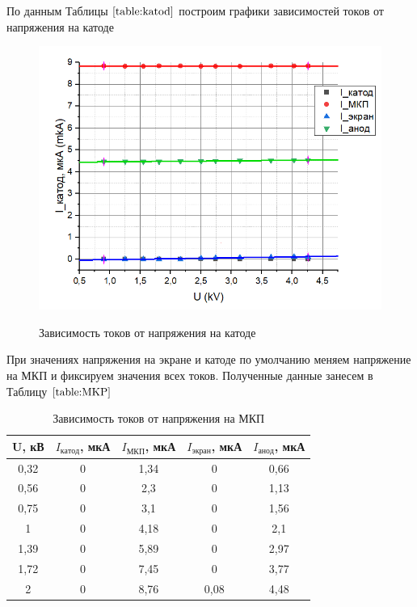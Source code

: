 \documentclass[a4paper,12pt]{article}
\begin{document}
По данным Таблицы $\ref{table:katod}$ построим графики зависимостей токов от напряжения на катоде


\begin{figure}[h!]
	\begin{center}
	\includegraphics[scale=0.8]{1}
	\label{graph:katod}
	\caption{Зависимость токов от напряжения на катоде}
	\end{center}
\end{figure}

\newpage

При значениях напряжения на экране и катоде по умолчанию меняем напряжение на МКП и фиксируем значения всех токов. Полученные данные занесем в Таблицу $\ref{table:MKP}$

\begin{table}[h]
\begin{center}
\caption{Зависимость токов от напряжения на МКП}
\label{table:MKP}
\begin{tabular}{|c|c|c|c|c|}
\hline
{\textbf{U}, кВ} & \multicolumn{1}{c|}{\textbf{$I_{катод}$}, мкА} & \multicolumn{1}{c|}{\textbf{$I_{МКП}$}, мкА} & \multicolumn{1}{c|}{\textbf{$I_{экран}$}, мкА} & {\textbf{$I_{анод}$}, мкА}  \\ \hline
0,32       & 0                 & 1,34            & 0                 & 0,66             \\ \hline
0,56       & 0                 & 2,3             & 0                 & 1,13             \\ \hline
0,75       & 0                 & 3,1             & 0                 & 1,56             \\ \hline
1          & 0                 & 4,18            & 0                 & 2,1              \\ \hline
1,39       & 0                 & 5,89            & 0                 & 2,97             \\ \hline
1,72       & 0                 & 7,45            & 0                 & 3,77             \\ \hline
2          & 0                 & 8,76            & 0,08              & 4,48             
\\ \hline
\end{tabular}
\end{center}
\end{table}
\end{document}
